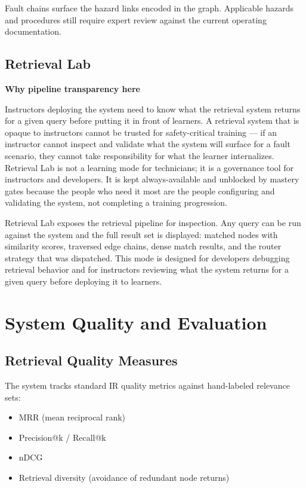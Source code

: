 \documentclass[10pt,letterpaper,twocolumn]{article}
\newenvironment{rationale}[1]{%
  \par\medskip\noindent
  \begin{lrbox}{\rationalebox}%
  \begin{minipage}{\dimexpr\linewidth-2\fboxsep-2\fboxrule\relax}
  \textbf{\sffamily\color{tmink}#1}\par\smallskip
}{%
  \end{minipage}%
  \end{lrbox}%
  \fcolorbox{tmaccent!55}{tmaccent!6}{\usebox{\rationalebox}}%
  \par\medskip
}
\begin{document}
Fault chains surface the hazard links encoded in the graph. Applicable hazards and procedures still require expert review against the current operating documentation.

\subsection{Retrieval Lab}
\label{sec:retrieval-lab}

\begin{rationale}{Why pipeline transparency here}
Instructors deploying the system need to know what the retrieval system returns for a given query before putting it in front of learners. A retrieval system that is opaque to instructors cannot be trusted for safety-critical training --- if an instructor cannot inspect and validate what the system will surface for a fault scenario, they cannot take responsibility for what the learner internalizes. Retrieval Lab is not a learning mode for technicians; it is a governance tool for instructors and developers. It is kept always-available and unblocked by mastery gates because the people who need it most are the people configuring and validating the system, not completing a training progression.
\end{rationale}

Retrieval Lab exposes the retrieval pipeline for inspection. Any query can be run against the system and the full result set is displayed: matched nodes with similarity scores, traversed edge chains, dense match results, and the router strategy that was dispatched. This mode is designed for developers debugging retrieval behavior and for instructors reviewing what the system returns for a given query before deploying it to learners.

\section{System Quality and Evaluation}
\label{sec:evaluation}

\subsection{Retrieval Quality Measures}
The system tracks standard IR quality metrics against hand-labeled relevance sets:
\begin{itemize}
  \item MRR (mean reciprocal rank)
  \item Precision@k / Recall@k
  \item nDCG
  \item Retrieval diversity (avoidance of redundant node returns)
\end{itemize}
\end{document}
